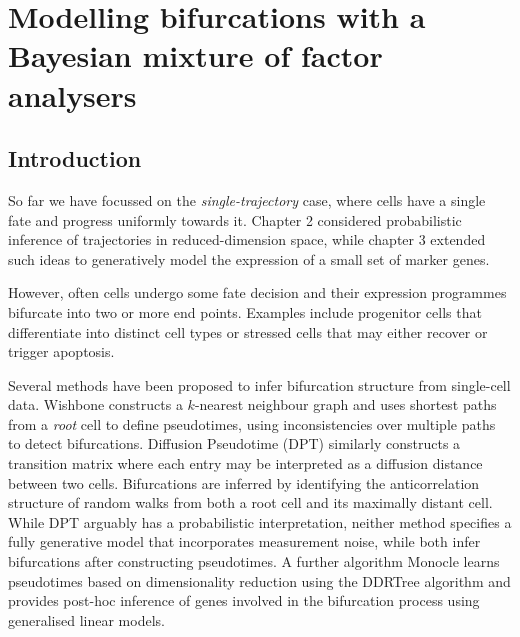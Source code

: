 \chapter{Modelling bifurcations with a Bayesian mixture of factor analysers}\label{ch:mfachap} %


\section{Introduction}

%

So far we have focussed on the \emph{single-trajectory} case, where cells have a single fate and progress uniformly towards it. Chapter 2 considered probabilistic inference of trajectories in reduced-dimension space, while chapter 3 extended such ideas to generatively model the expression of a small set of marker genes.

However, often cells undergo some fate decision and their expression programmes bifurcate into two or more end points. Examples include progenitor cells that differentiate into distinct cell types or stressed cells that may either recover or trigger apoptosis.

Several methods have been proposed to infer bifurcation structure from single-cell data. Wishbone \cite{setty2016wishbone} constructs a $k$-nearest neighbour graph and uses shortest paths from a \emph{root} cell to define pseudotimes, using inconsistencies over multiple paths to detect bifurcations.  Diffusion Pseudotime (DPT) \cite{haghverdi2016diffusion} similarly constructs a transition matrix where each entry may be interpreted as a diffusion distance between two cells. Bifurcations are inferred by identifying the anticorrelation structure of random walks from both a root cell and its maximally distant cell. While DPT arguably has a probabilistic interpretation, neither method specifies a fully generative model that incorporates measurement noise, while both infer bifurcations after constructing pseudotimes. A further algorithm Monocle  \cite{qiu2017single} learns pseudotimes based on dimensionality reduction using the DDRTree algorithm \cite{mao2015novel} and provides post-hoc inference of genes involved in the bifurcation process using generalised linear models.

